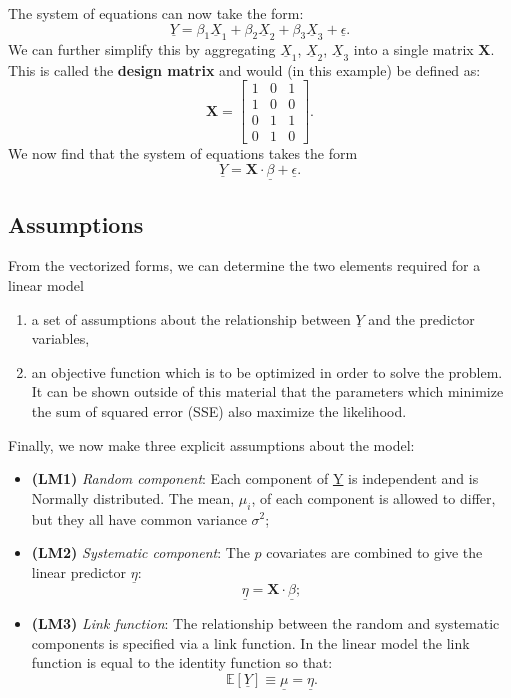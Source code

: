 \documentclass{article}
\begin{document}
The system of equations can now take the form:
\begin{equation}
    \underline{Y} = \beta_1\underline{X}_1 + \beta_2\underline{X}_2 + \beta_3\underline{X}_3 + \underline{\epsilon}.
\end{equation}
We can further simplify this by aggregating $\underline{X}_1$, $\underline{X}_2$, $\underline{X}_3$ into a single matrix $\mathbf{X}$. This is called the \textbf{design matrix} and would (in this example) be defined as:
\begin{equation}
    \mathbf{X} = \begin{bmatrix} 1 & 0 & 1 \\ 1 & 0 & 0 \\ 0 & 1 & 1 \\ 0 & 1 & 0 \end{bmatrix}.
\end{equation}
We now find that the system of equations takes the form
\begin{equation}
    \underline{Y} = \mathbf{X}\cdot\underline{\beta} + \underline{\epsilon}.
\end{equation}

\subsection{Assumptions}
From the vectorized forms, we can determine the two elements required for a linear model
\begin{enumerate}
    \item a set of assumptions about the relationship between $\underline{Y}$ and the predictor variables,
    \item an objective function which is to be optimized in order to solve the problem. It can be shown outside of this material that the parameters which minimize the sum of squared error (SSE) also maximize the likelihood.
\end{enumerate}
Finally, we now make three explicit assumptions about the model:
\begin{itemize}
    \item \textbf{(LM1)} \textit{Random component}: Each component of \underline{Y} is independent and is Normally distributed. The mean, $\mu_i$, of each component is allowed to differ, but they all have common variance $\sigma^2$; 
    \item \textbf{(LM2)} \textit{Systematic component}: The $p$ covariates are combined to give the linear predictor $\underline{\eta}$:
\begin{equation}
    \underline{\eta} = \mathbf{X}\cdot\underline{\beta};
\end{equation}
\item \textbf{(LM3)} \textit{Link function}: The relationship between the random and systematic components is specified via a link function. In the linear model the link function is equal to the identity function so that:
\begin{equation}
    \mathbb{E}[\underline{Y}] \equiv \underline{\mu} = \underline{\eta}.
\end{equation}
\end{itemize}
\end{document}
